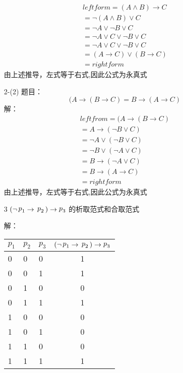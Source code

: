 \documentclass[11pt,oneside,a4paper]{article}
\begin{document}
\begin{itemize}
\[\begin{array}{l}
    leftform = (A \wedge B) \to C\\
    = \neg (A \wedge B) \vee C\\
    = \neg A \vee \neg B \vee C\\
    = \neg A \vee C \vee \neg B \vee C\\
    = \neg A \vee C \vee \neg B \vee C\\
    = (A \to C) \vee (B \to C) \\
    = rightform
   \end{array}\]
   由上述推导，左式等于右式,因此公式为永真式
        \item[2-(2)] 
        题目：\[(A \to (B \to C) = B \to (A \to C)\]
        解：
        \[\begin{array}{l}
            leftfrom = (A \to (B \to C)\\
            = A \to (\neg B \vee C)\\
            = \neg A \vee (\neg B \vee C)\\
            = \neg B \vee (\neg A \vee C)\\
            = B \to (\neg A \vee C)\\
            = B \to (A \to C) \\
            = rightform
           \end{array}\]
    由上述推导，左式等于右式,因此公式为永真式
    \newpage
        \item[3] $(\neg \mathop p\nolimits_1  \to {\rm{ }}\mathop p\nolimits_2 {\rm{ }}){\rm{ }} \to \mathop p\nolimits_3$ 的析取范式和合取范式 \par
        解：
        \begin{table}[!h]
        \centering
            \begin{tabular}{|l|l|l|c|}
            \hline
            $p_1$ & $p_2$ & $p_3$ & $(\neg \mathop p\nolimits_1  \to {\rm{ }}\mathop p\nolimits_2 {\rm{ }}){\rm{ }} \to \mathop p\nolimits_3$ \\ \hline
            0  & 0  & 0  & 1  \\ \hline
            0  & 0  & 1  & 1  \\ \hline
            0  & 1  & 0  & 0  \\ \hline
            0  & 1  & 1  & 1  \\ \hline
            1  & 0  & 0  & 0  \\ \hline
            1  & 0  & 1  & 0  \\ \hline
            1  & 1  & 0  & 0  \\ \hline
            1  & 1  & 1  & 1  \\ \hline
            \end{tabular}
            \end{table}
        

\end{itemize}
\end{document}
